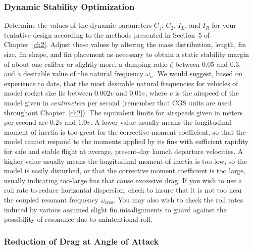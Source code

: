 \subsubsection{Dynamic Stability Optimization}\label{ch4:sec:5.2.4}

Determine the values of the dynamic parameters $C_1$, $C_2$, $I_L$, and $I_R$ for your tentative
design according to the methods presented in Section~5 of Chapter~\ref{ch2}. Adjust
these values by altering the mass distribution, length, fin size, fin shape, and fin placement as
necessary to obtain a static stability margin of about one caliber or slightly more, a damping
ratio $\zeta$ between 0.05 and 0.3, and a desirable value of the natural frequency $\omega_n$. We
would suggest, based on experience to date, that the most desirable natural frequencies for
vehicles of model rocket size lie between $0.002v$ and $0.01v$, where $v$ is the airspeed of the
model given in \emph{centimeters} per second (remember that CGS units are used throughout
Chapter~\ref{ch2}). The equivalent limits for airspeeds given in meters per second are $0.2v$ and
$1.0v$. A lower value usually means the longitudinal moment of inertia is too great for the
corrective moment coefficient, so that the model cannot respond to the moments applied by its fins
with sufficient rapidity for safe and stable flight at average, present-day launch departure
velocities. A higher value usually means the longitudinal moment of inertia is too low, so the
model is easily disturbed, or that the corrective moment coefficient is too large, usually
indicating too-large fins that cause excessive drag. If you wish to use a roll rate to reduce
horizontal dispersion, check to insure that it is not too near the coupled resonant frequency
$\omega_{\mathrm{cres}}$. You may also wish to check the roll rates induced by various assumed
slight fin misalignments to guard against the possibility of resonance due to unintentional roll.

\subsubsection{Reduction of Drag at Angle of Attack}\label{ch4:sec:5.2.5}

